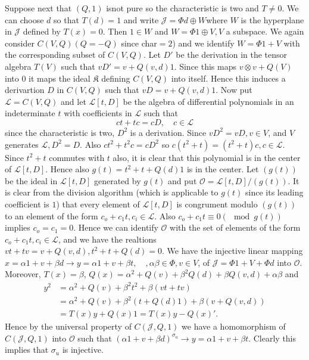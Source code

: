 Suppose next that $(Q,1)$ isnot pure so the characteristic is two and
$T\neq 0$. We can choose $d$ so that $T(d)=1$ and write
$\mathscr{J}=\Phi d\oplus W$\pageoriginale where $W$ is the hyperplane
in $\mathscr{J}$ defined by $T(x)=0$. Then $1\in W$ and $W=\Phi
1\oplus V,V$ a subspace. We again consider $C(V,Q)(Q=-Q)$ since
char$=2$) and we identify $W=\Phi 1+V$ with the corresponding subset
of $C(V,Q)$. Let $D'$ be the derivation in the tensor algebra
$T(V)$ such that $vD'=v+Q(v,d)1$. Since this maps $v\otimes v+Q(V)$
into $0$ it maps the ideal $\mathfrak{K}$ defining $C(V,Q)$ into
itself. Hence this induces a derivartion $D$ in $C(V,Q)$ such that
$vD=v+Q(v,d)1$. Now put $\mathscr{L}=C(V,Q)$ and let $\mathscr{L}[t,
  D]$ be the algebra of differential polynomials in an indeterminate
$t$ with coefficients in $\mathscr{L}$ such that
\begin{equation*}
ct+tc=cD,\quad c\in \mathscr{L}\tag{22}\label{c1:eq22}
\end{equation*}
since the characteristic is two, $D^{2}$ is a derivation. Since
$vD^{2}=vD, v\in V$, and $V$ generates $\mathscr{L},
D^{2}=D$. Also $ct^{2}+t^{2}c=cD^{2}$ so $c(t^{2}+t)=(t^{2}+t)c,
c\in \mathscr{L}$. Since $t^{2}+t$ commutes with $t$ also, it is
clear that this polynomial is in the center of $\mathscr{L}[t,
  D]$. Hence also $g(t)=t^{2}+t+Q(d)1$ is in the center. Let $(g(t))$
be the ideal in $\mathscr{L}[t, D]$ generated by $g(t)$ and put
$\mathscr{O}=\mathscr{L}[t,D]/(g(t))$. It is clear from the division
algorithm (which is applicable to $g(t)$ since its leading coefficient
is $1$) that every element of $\mathscr{L}[t, D]$ is congrument modulo
$(g(t))$ to an element of the form $c_o+c_1t,c_i\in
\mathscr{L}$. Also $c_o+c_1t\equiv 0 (\mod g(t))$ implies
$c_o=c_1=0$. Hence we can identify $\mathscr{O}$ with the set of
elements of the form $c_o+c_1t, c_i\in \mathscr{L}$, and we have
the realtions $vt+tv=v+Q(v,d),t^{2}+t+Q(d)=0$. We have the injective
linear mapping\pageoriginale $x=\alpha 1 +v+\beta d\to y=\alpha
1+v+\beta t,\quad, \alpha \beta \in \Phi, v\in V$, of
$\mathscr{J}=\Phi 1+V+\Phi d $ into $\mathscr{O}$. Moreover,
$T(x)=\beta$, $Q(x)=\alpha^{2}+Q(v)+\beta^{2}Q(d)+\beta Q(v,d)+\alpha
\beta$ and 
\begin{align*}
  y^{2}&=\alpha^{2}+Q(v)+\beta^{2}t^{2}+\beta (vt+tv)\\
  &=\alpha^{2}+Q(v)+\beta^{2}(t+Q(d)1)+\beta(v+Q(v,d))\\
  &=T(x)y+Q(x)1=T(x)y-Q(x)'.
\end{align*}
Hence by the universal property of $C(\mathscr{J},Q,1)$ we have a
homomorphism of $C(\mathscr{J}, Q,1)$ into $\mathscr{O}$ such that
$(\alpha 1+v+\beta d)^{\sigma_u}\to y=\alpha 1+v+\beta t$. Clearly
this implies that $\sigma_u$ is injective.


